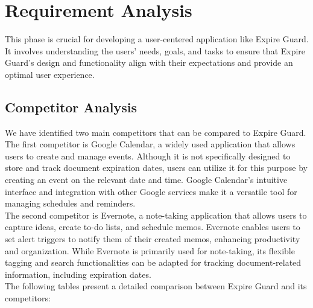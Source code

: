 \section{Requirement Analysis}
This phase is crucial for developing a user-centered application like Expire Guard. It involves understanding the users' needs, goals, and tasks to ensure that Expire Guard's design and functionality align with their expectations and provide an optimal user experience.
\subsection{Competitor Analysis}
We have identified two main competitors that can be compared to Expire Guard. The first competitor is Google Calendar, a widely used application that allows users to create and manage events. Although it is not specifically designed to store and track document expiration dates, users can utilize it for this purpose by creating an event on the relevant date and time. Google Calendar's intuitive interface and integration with other Google services make it a versatile tool for managing schedules and reminders.\\
The second competitor is Evernote, a note-taking application that allows users to capture ideas, create to-do lists, and schedule memos. Evernote enables users to set alert triggers to notify them of their created memos, enhancing productivity and organization. While Evernote is primarily used for note-taking, its flexible tagging and search functionalities can be adapted for tracking document-related information, including expiration dates.\\
The following tables present a detailed comparison between Expire Guard and its competitors:\\
